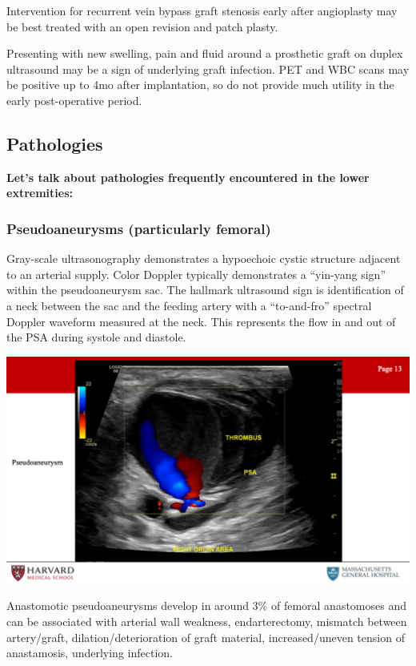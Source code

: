 \documentclass[
]{book}
\begin{document}
Intervention for recurrent vein bypass graft stenosis early after
angioplasty may be best treated with an open revision and patch
plasty.\citep{jongsma2016}

Presenting with new swelling, pain and fluid around a prosthetic graft
on duplex ultrasound may be a sign of underlying graft infection. PET
and WBC scans may be positive up to 4mo after implantation, so do not
provide much utility in the early post-operative period.\citep{puges2019}

\hypertarget{pathologies}{%
\subsection{Pathologies}\label{pathologies}}

\textbf{Let's talk about pathologies frequently encountered in the lower
extremities:}

\hypertarget{psa}{%
\subsubsection{Pseudoaneurysms (particularly femoral)}\label{psa}}

Gray-scale ultrasonography demonstrates a hypoechoic cystic structure
adjacent to an arterial supply. Color Doppler typically demonstrates a
``yin-yang sign'' within the pseudoaneurysm sac. The hallmark ultrasound
sign is identification of a neck between the sac and the feeding artery
with a ``to-and-fro'' spectral Doppler waveform measured at the neck. This
represents the flow in and out of the PSA during systole and diastole.

\includegraphics[width=15.01in]{images/vasc_lab2/Slide14}

Anastomotic pseudoaneurysms develop in around 3\% of femoral anastomoses
and can be associated with arterial wall weakness, endarterectomy,
mismatch between artery/graft, dilation/deterioration of graft material,
increased/uneven tension of anastamosis, underlying
infection.\citep{pellerito2019}
\end{document}
